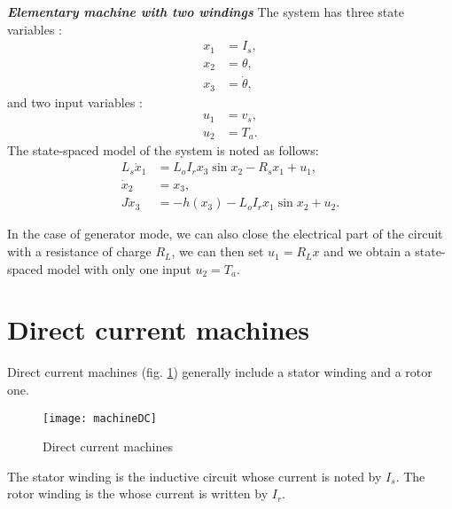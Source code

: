 \begin{exemple}{\bf \em Elementary machine with two windings}
The system has three state variables :
\begin{equation*} \begin{split}
x_1 &= I_s, \\
x_2 &= \theta, \\
x_3 &= \dot \theta,
\end{split} \end{equation*}
and two input variables :
\begin{equation*} \begin{split}
u_1 &= v_s, \\
u_2 &= T_a.
\end{split} \end{equation*}
The state-spaced model of the system is noted as follows: 
\begin{align*}
L_s\dot x_1 &= L_oI_rx_3 \sin x_2 - R_s x_1 + u_1, \\
\dot x_2 &= x_3, \\
J\dot x_3 &= -h(x_3) - L_oI_rx_1 \sin x_2 + u_2.
\end{align*}

In the case of generator mode, we can also close the electrical part of the circuit with a resistance of charge $R_L$, we can then set $u_1=R_L x$ and we obtain a state-spaced model with only one input $u_2=T_a$.

\cqfd



\end{exemple}

\section{Direct current machines}


Direct current machines (fig.
\ref{fig:machineDC}) generally include a stator winding and a rotor one.  
\begin{figure}[t]
\begin{center}
\texttt{[image: machineDC]}
\caption{Direct current machines}
\label{fig:machineDC}
\end{center}
\end{figure}

The stator winding is the inductive circuit whose current is noted  by $I_s$. The rotor winding is the  whose current is written by $I_r$. 


